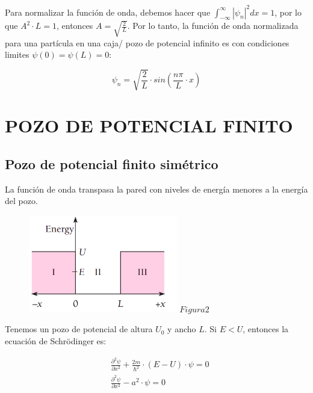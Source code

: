 \documentclass[a4paper]{article}
\begin{document}
        \indent Para normalizar la función de onda, debemos hacer que $\int_{-\infty}^{\infty} \left| \psi_n \right|^{2} dx = 1$, por lo que $A^{2} \cdot L = 1$, entonces $A = \sqrt{\frac{2}{L}}$. Por lo tanto, la función de onda normalizada para una partícula en una caja/ pozo de potencial infinito es con condiciones limites $\psi(0) = \psi(L) = 0$:

        \begin{equation}
            \psi_n = \sqrt{\frac{2}{L}} \cdot sin(\frac{n\pi}{L} \cdot x)
        \end{equation}
    

        \section{POZO DE POTENCIAL FINITO}

            \subsection{Pozo de potencial finito simétrico}

            \indent La función de onda transpasa la pared con niveles de energía menores a la energía del pozo.

            \begin{figure}[h!]
                \centering
                \includegraphics[width=6.5cm]{../../imagenes/pozo_potencial_finito.png}
                \vspace{-0.5mm}
                \textbf{$Figura 2$}
            \end{figure}

            \indent Tenemos un pozo de potencial de altura $U_0$ y ancho $L$. Si $E < U$, entonces la ecuación de Schrödinger es:

            \begin{align*}
                &\frac{\partial^2 \psi} {\partial x^2} + \frac{2m}{\hbar^2} \cdot (E - U) \cdot \psi = 0\\
                &\frac{\partial^2 \psi} {\partial x^2} - a^2 \cdot \psi = 0\\
            \end{align*}
\end{document}
